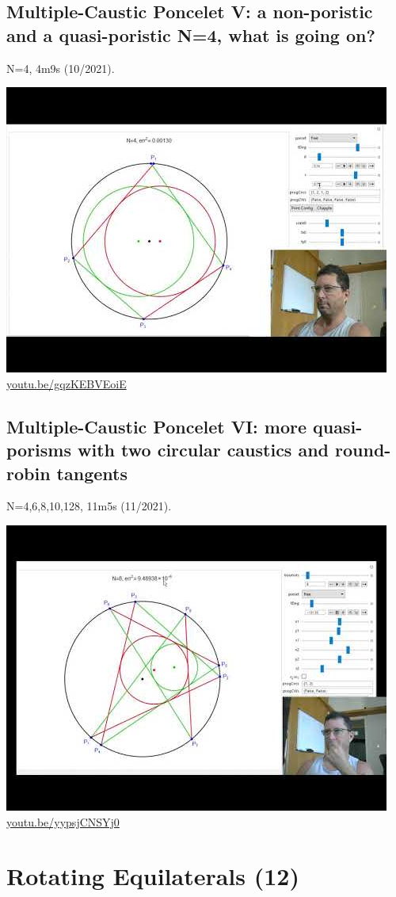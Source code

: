 \documentclass[12pt]{amsart}
\begin{document}
\subsection{Multiple-Caustic Poncelet V: a non-poristic and a quasi-poristic N=4, what is going on?}
\label{vid:gqzKEBVEoiE}
\noindent N=4, 4m9s (10/2021). 
\begin{center}\includegraphics[width=.5\textwidth]{pics/gqzKEBVEoiE.jpg} \\ 
\href{https://youtu.be/gqzKEBVEoiE}{\url{youtu.be/gqzKEBVEoiE}}\end{center}
% 
\subsection{Multiple-Caustic Poncelet VI: more quasi-porisms with two circular caustics and round-robin tangents}
\label{vid:yypsjCNSYj0}
\noindent N=4,6,8,10,128, 11m5s (11/2021). 
\begin{center}\includegraphics[width=.5\textwidth]{pics/yypsjCNSYj0.jpg} \\ 
\href{https://youtu.be/yypsjCNSYj0}{\url{youtu.be/yypsjCNSYj0}}\end{center}
% 

\section{Rotating Equilaterals (12)}
\end{document}
